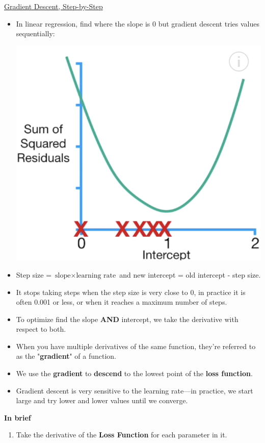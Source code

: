 \documentclass[12pt, titlepage, french]{report}
\begin{document}
\begin{YTB_SUMM_AUTO_NUMB}[label = {SQ-desc-grad}]{\href{https://www.youtube.com/watch?v=sDv4f4s2SB8}{Gradient Descent, Step-by-Step}}
\begin{itemize}[leftmargin = *]
	\item	In linear regression, find where the slope is 0 but gradient descent tries values sequentially:
		\begin{center}
		\includegraphics[scale=0.4]{src/SQ-GD-SSR-4.png}
		\end{center}
	\item	Step size = $\text{slope} \times \text{learning rate}$ and new intercept = old intercept  - step size.
	\item	It stops taking steps when the step size is very close to 0, in practice it is often 0.001 or less, or when it reaches a maximum number of steps.
	\item	To optimize find the slope \textbf{AND} intercept, we take the derivative with respect to both.
	\item	When you have multiple derivatives of the same function, they're referred to as the "\textbf{gradient}" of a function.
	\item	We use the \textbf{gradient} to \textbf{descend} to the lowest point of the \textbf{loss function}.
	\item	Gradient descent is very sensitive to the learning rate---in practice, we start large and try lower and lower values until we converge.
\end{itemize}
\tcbline
\textbf{In brief}
\begin{enumerate}
	\item	Take the derivative of the \textbf{Loss Function} for each parameter in it.

\end{enumerate}
\end{YTB_SUMM_AUTO_NUMB}
\end{document}
